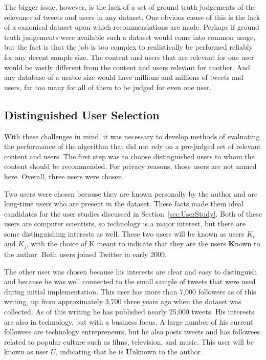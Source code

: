 The bigger issue, however, is the lack of a set of ground truth judgements of the relevance of tweets and users in any dataset. One obvious cause of this is the lack of a canonical dataset upon which recommendations are made. Perhaps if ground truth judgements were available such a dataset would come into common usage, but the fact is that the job is too complex to realistically be performed reliably for any decent sample size. The content and users that are relevant for one user would be vastly different from the content and users relevant for another. And any database of a usable size would have millions and millions of tweets and users, far too many for all of them to be judged for even one user.


\subsection{Distinguished User Selection}

With these challenges in mind, it was necessary to develop methods of evaluating the performance of the algorithm that did not rely on a pre-judged set of relevant content and users. The first step was to choose distinguished users to whom the content should be recommended. For privacy reasons, those users are not named here. Overall, three users were chosen.

Two users were chosen because they are known personally by the author and are long-time users who are present in the dataset. These facts made them ideal candidates for the user studies discussed in Section~\ref{sec:UserStudy}. Both of these users are computer scientists, so technology is a major interest, but there are some distinguishing interests as well. These two users will be known as users $K_{i}$ and $K_{j}$, with the choice of K meant to indicate that they are the users {\bf K}nown to the author. Both users joined Twitter in early 2009. 

The other user was chosen because his interests are clear and easy to distinguish and because he was well connected to the small sample of tweets that were used during initial implementation. This user has more than 7,000 followers as of this writing, up from approximately 3,700 three years ago when the dataset was collected. As of this writing he has published nearly 25,000 tweets. His interests are also in technology, but with a business focus. A large number of his current followees are technology entrepreneurs, but he also posts tweets and has followees related to popular culture such as films, television, and music. This user will be known as user $U$, indicating that he is {\bf U}nknown to the author.



